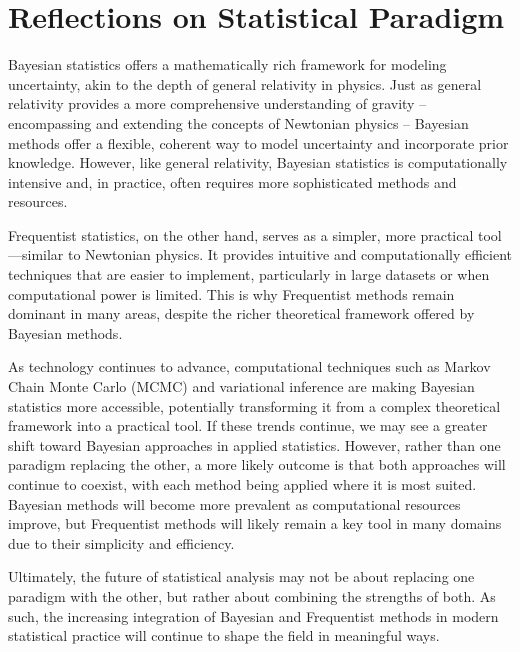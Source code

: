 \chapter{Reflections on Statistical Paradigm}
Bayesian statistics offers a mathematically rich framework for modeling uncertainty, akin to the depth of general relativity in physics. Just as general relativity provides a more comprehensive understanding of gravity -- encompassing and extending the concepts of Newtonian physics -- Bayesian methods offer a flexible, coherent way to model uncertainty and incorporate prior knowledge. However, like general relativity, Bayesian statistics is computationally intensive and, in practice, often requires more sophisticated methods and resources.

Frequentist statistics, on the other hand, serves as a simpler, more practical tool—similar to Newtonian physics. It provides intuitive and computationally efficient techniques that are easier to implement, particularly in large datasets or when computational power is limited. This is why Frequentist methods remain dominant in many areas, despite the richer theoretical framework offered by Bayesian methods.

As technology continues to advance, computational techniques such as Markov Chain Monte Carlo (MCMC) and variational inference are making Bayesian statistics more accessible, potentially transforming it from a complex theoretical framework into a practical tool. If these trends continue, we may see a greater shift toward Bayesian approaches in applied statistics. However, rather than one paradigm replacing the other, a more likely outcome is that both approaches will continue to coexist, with each method being applied where it is most suited. Bayesian methods will become more prevalent as computational resources improve, but Frequentist methods will likely remain a key tool in many domains due to their simplicity and efficiency.

Ultimately, the future of statistical analysis may not be about replacing one paradigm with the other, but rather about combining the strengths of both. As such, the increasing integration of Bayesian and Frequentist methods in modern statistical practice will continue to shape the field in meaningful ways.